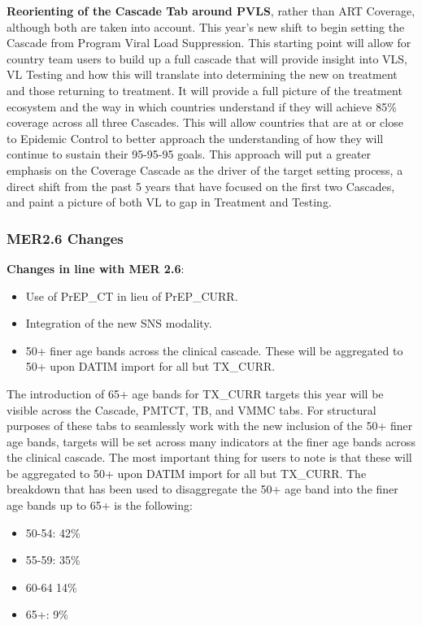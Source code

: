 \documentclass[
  openany]{book}
\begin{document}
\textbf{Reorienting of the Cascade Tab around PVLS}, rather than ART Coverage, although both are taken into account. This year's new shift to begin setting the Cascade from Program Viral Load Suppression. This starting point will allow for country team users to build up a full cascade that will provide insight into VLS, VL Testing and how this will translate into determining the new on treatment and those returning to treatment. It will provide a full picture of the treatment ecosystem and the way in which countries understand if they will achieve 85\% coverage across all three Cascades. This will allow countries that are at or close to Epidemic Control to better approach the understanding of how they will continue to sustain their 95-95-95 goals. This approach will put a greater emphasis on the Coverage Cascade as the driver of the target setting process, a direct shift from the past 5 years that have focused on the first two Cascades, and paint a picture of both VL to gap in Treatment and Testing.

\hypertarget{mer2.6-changes}{%
\subsubsection{MER2.6 Changes}\label{mer2.6-changes}}

\textbf{Changes in line with MER 2.6}:

\begin{itemize}
\item
  Use of PrEP\_CT in lieu of PrEP\_CURR.
\item
  Integration of the new SNS modality.
\item
  50+ finer age bands across the clinical cascade. These will be aggregated to 50+ upon DATIM import for all but TX\_CURR.
\end{itemize}

The introduction of 65+ age bands for TX\_CURR targets this year will be visible across the Cascade, PMTCT, TB, and VMMC tabs. For structural purposes of these tabs to seamlessly work with the new inclusion of the 50+ finer age bands, targets will be set across many indicators at the finer age bands across the clinical cascade. The most important thing for users to note is that these will be aggregated to 50+ upon DATIM import for all but TX\_CURR. The breakdown that has been used to disaggregate the 50+ age band into the finer age bands up to 65+ is the following:

\begin{itemize}
\item
  50-54: 42\%
\item
  55-59: 35\%
\item
  60-64 14\%
\item
  65+: 9\%
\end{itemize}
\end{document}
